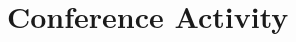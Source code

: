 \documentclass[11pt,letterpaper]{report}
\begin{document}








    \section*{Conference Activity}




\end{document}
